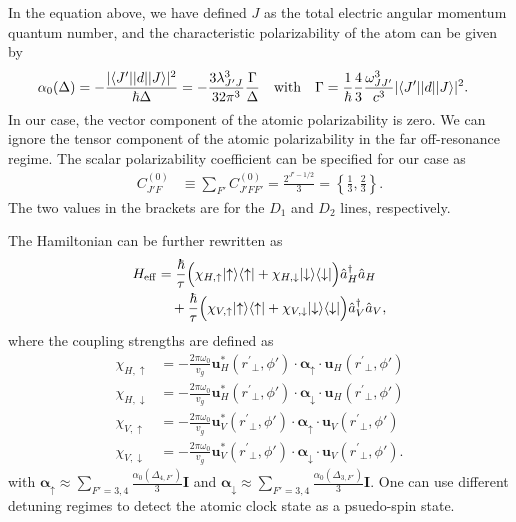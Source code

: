 \documentclass[preprint,aps,pra,onecolumn]{revtex4-1} %
\renewcommand{\tensor}[1]{\boldsymbol{#1}}
\begin{document}
In the equation above, we have defined $ J $ as the total electric angular momentum quantum number, and the characteristic polarizability of the atom can be given by
\begin{align} \label{Eq::alpha0}
\alpha_0(\Delta) & =  -\frac{|  \langle{ J' }\rvert| d | \lvert{ J }\rangle |^2}{\hbar \Delta } = - \frac{3 \lambda_{J' J}^3}{32 \pi^3} \frac{ \Gamma }{ \Delta }\quad \text{with}\quad 
\Gamma = \frac{1}{\hbar} \frac{4}{3} \frac{\omega_{J J'}^3}{c^3} | \langle{ J' }\rvert| d | \lvert{ J }\rangle |^2.
\end{align}
In our case, the vector component of the atomic polarizability is zero. We can ignore the tensor component of the atomic polarizability in the far off-resonance regime. The scalar polarizability coefficient can be specified for our case as
\begin{align} \label{Eq::alpha0}
C_{J' F}^{(0)} &\equiv \sum_{F'} C_{J' F F'}^{(0)} =   \frac{2^{J'-1/2}}{3} =\left\{ \frac{1}{3},\frac{2}{3}\right\}.
\end{align}
The two values in the brackets are for the $D_1$ and $D_2$ lines, respectively.

The Hamiltonian can be further rewritten as
\begin{align}
H_{\rm eff} & = \frac{ \hbar }{ \tau}\Big( \chi_{H,\uparrow}\lvert{\uparrow}\rangle\langle{\uparrow}\rvert +  \chi_{H,\downarrow} \lvert{\downarrow}\rangle\langle{\downarrow}\rvert \Big) \hat{a}_H^\dagger \hat{a}_H \nonumber\\
&\quad +  \frac{ \hbar }{ \tau} \Big( \chi_{V,\uparrow}\lvert{\uparrow}\rangle\langle{\uparrow}\rvert +  \chi_{V,\downarrow} \lvert{\downarrow}\rangle\langle{\downarrow}\rvert \Big) \hat{a}_V^\dagger \hat{a}_V  ,
\end{align}
where the coupling strengths are defined as
\begin{align}
\chi_{H,\uparrow} &=  -\frac{2\pi\omega_0}{v_g} \mathbf{u}^*_{H}(r^\prime\!\!_\perp,\phi') \cdot\tensor{\alpha}_{\uparrow}\cdot \mathbf{u}_{H}(r^\prime\!\!_\perp,\phi') \\
\chi_{H,\downarrow} &=  -\frac{2\pi\omega_0}{v_g} \mathbf{u}^*_{H}(r^\prime\!\!_\perp,\phi') \cdot\tensor{\alpha}_{\downarrow}\cdot \mathbf{u}_{H}(r^\prime\!\!_\perp,\phi') \\
\chi_{V,\uparrow} &=  -\frac{2\pi\omega_0}{v_g}  \mathbf{u}^*_{V}(r^\prime\!\!_\perp,\phi') \cdot\tensor{\alpha}_{\uparrow}\cdot \mathbf{u}_{V}(r^\prime\!\!_\perp,\phi')  \\
\chi_{V,\downarrow} &=  -\frac{2\pi\omega_0}{v_g}  \mathbf{u}^*_{V}(r^\prime\!\!_\perp,\phi') \cdot\tensor{\alpha}_{\downarrow}\cdot \mathbf{u}_{V}(r^\prime\!\!_\perp,\phi'). 
\end{align}
with $\tensor{\alpha}_{\uparrow} \approx\sum_{F'=3,4}\frac{\alpha_0(\Delta_{4,F'})}{3}\mathbf{I}$
and $\tensor{\alpha}_{\downarrow} \approx\sum_{F'=3,4}\frac{\alpha_0(\Delta_{3,F'})}{3}\mathbf{I}$.
One can use different detuning regimes to detect the atomic clock state as a psuedo-spin state.
\end{document}
